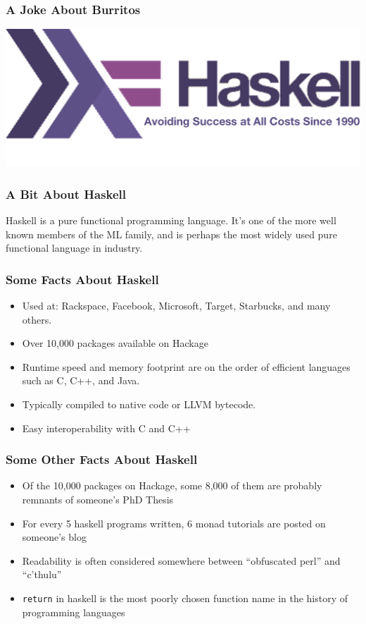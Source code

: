\documentclass{beamer}
\begin{document}
\begin{frame}
  \frametitle{A Joke About Burritos}
  \begin{center}
    \includegraphics[width=.80\paperwidth]{images/haskell.png}
  \end{center}
\end{frame}

\begin{frame}
  \frametitle{A Bit About Haskell}
  Haskell is a pure functional programming language.  It's one of the
  more well known members of the ML family, and is perhaps the most
  widely used pure functional language in industry.
\end{frame}

\begin{frame}
  \frametitle{Some Facts About Haskell}
  \begin{itemize}
  \item Used at: Rackspace, Facebook, Microsoft, Target, Starbucks, and many others.
  \item Over 10,000 packages available on Hackage
  \item Runtime speed and memory footprint are on the order of efficient languages such as C, C++, and Java.
  \item Typically compiled to native code or LLVM bytecode.
  \item Easy interoperability with C and C++
  \end{itemize}
\end{frame}

\begin{frame}
  \frametitle{Some Other Facts About Haskell}
  \begin{itemize}
    \item Of the 10,000 packages on Hackage, some 8,000 of them are probably remnants of someone's PhD Thesis
    \item For every 5 haskell programs written, 6 monad tutorials are posted on someone's blog
    \item Readability is often considered somewhere between ``obfuscated perl'' and ``c'thulu''
    \item {\tt return} in haskell is the most poorly chosen function name in the history of programming languages
  \end{itemize}
\end{frame}
\end{document}
